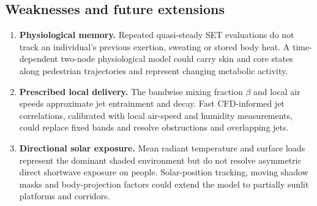 \subsection*{Weaknesses and future extensions}
\begin{enumerate}[leftmargin=*,itemsep=3pt,topsep=2pt,parsep=0pt]
\item \textbf{Physiological memory.} Repeated quasi-steady SET evaluations do not track an individual's previous exertion, sweating or stored body heat. A time-dependent two-node physiological model could carry skin and core states along pedestrian trajectories and represent changing metabolic activity.
\item \textbf{Prescribed local delivery.} The bandwise mixing fraction $\beta$ and local air speeds approximate jet entrainment and decay. Fast CFD-informed jet correlations, calibrated with local air-speed and humidity measurements, could replace fixed bands and resolve obstructions and overlapping jets.
\item \textbf{Directional solar exposure.} Mean radiant temperature and surface loads represent the dominant shaded environment but do not resolve asymmetric direct shortwave exposure on people. Solar-position tracking, moving shadow masks and body-projection factors could extend the model to partially sunlit platforms and corridors.
\end{enumerate}
\endgroup
\FloatBarrier
